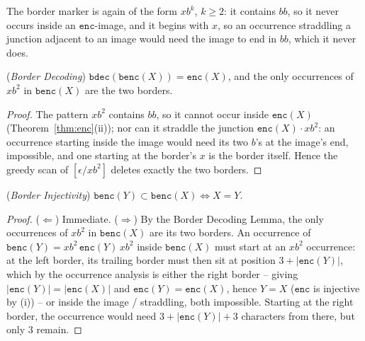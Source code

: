 \documentclass[runningheads,envcountsect]{llncs}
\renewenvironment{remark}
  {\rmfamily\trivlist\item[\hskip\labelsep{\itshape Remark.}]\ignorespaces}
  {\endtrivlist}
\begin{document}
\begin{remark}
    The border marker is again of the form $xb^k$, $k \ge 2$: it contains $bb$, so it never occurs inside an $\mathtt{enc}$-image, and it begins with $x$, so an occurrence straddling a junction adjacent to an image would need the image to end in $bb$, which it never does.
\end{remark}

\begin{lemma}
    (\emph{Border Decoding})
    $\mathtt{bdec}(\mathtt{benc}(X)) = \mathtt{enc}(X)$, and the only occurrences of $xb^2$ in $\mathtt{benc}(X)$ are the two borders.
\end{lemma}

\begin{proof}
    The pattern $xb^2$ contains $bb$, so it cannot occur inside $\mathtt{enc}(X)$ (Theorem~\ref{thm:enc}(ii)); nor can it straddle the junction $\mathtt{enc}(X)\cdot xb^2$: an occurrence starting inside the image would need its two $b$'s at the image's end, impossible, and one starting at the border's $x$ is the border itself. Hence the greedy scan of $[\epsilon/xb^2]$ deletes exactly the two borders.
\end{proof}

\begin{lemma}
    (\emph{Border Injectivity})
    $\mathtt{benc}(Y) \subset \mathtt{benc}(X) \Leftrightarrow X = Y$.
    \label{lem:benc injectivity}
\end{lemma}

\begin{proof}
    ($\Leftarrow$) Immediate. ($\Rightarrow$) By the Border Decoding Lemma, the only occurrences of $xb^2$ in $\mathtt{benc}(X)$ are its two borders. An occurrence of $\mathtt{benc}(Y) = xb^2\,\mathtt{enc}(Y)\,xb^2$ inside $\mathtt{benc}(X)$ must start at an $xb^2$ occurrence: at the left border, its trailing border must then sit at position $3 + |\mathtt{enc}(Y)|$, which by the occurrence analysis is either the right border -- giving $|\mathtt{enc}(Y)| = |\mathtt{enc}(X)|$ and $\mathtt{enc}(Y) = \mathtt{enc}(X)$, hence $Y = X$ ($\mathtt{enc}$ is injective by (i)) -- or inside the image / straddling, both impossible. Starting at the right border, the occurrence would need $3 + |\mathtt{enc}(Y)| + 3$ characters from there, but only $3$ remain.
\end{proof}
\end{document}
